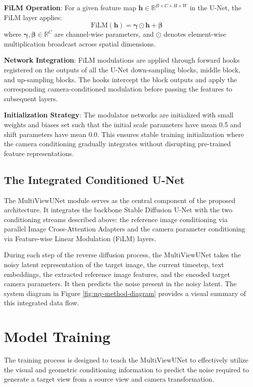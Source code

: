 \textbf{FiLM Operation}: For a given feature map $\mathbf{h} \in \mathbb{R}^{B \times C \times H \times W}$ in the U-Net, the FiLM layer applies:
\[ \text{FiLM}(\mathbf{h}) = \boldsymbol{\gamma} \odot \mathbf{h} + \boldsymbol{\beta} \]
where $\boldsymbol{\gamma}, \boldsymbol{\beta} \in \mathbb{R}^C$ are channel-wise parameters, and $\odot$ denotes element-wise multiplication broadcast across spatial dimensions.

\textbf{Network Integration}: FiLM modulations are applied through forward hooks registered on the outputs of all the U-Net down-sampling blocks, middle block, and up-sampling blocks. The hooks intercept the block outputs and apply the corresponding camera-conditioned modulation before passing the features to subsequent layers.

\textbf{Initialization Strategy}: The modulator networks are initialized with small weights and biases set such that the initial scale parameters have mean 0.5 and shift parameters have mean 0.0. This ensures stable training initialization where the camera conditioning gradually integrates without disrupting pre-trained feature representations.

\subsection{The Integrated Conditioned U-Net}
The $\text{MultiViewUNet}$ module serves as the central component of the proposed architecture. It integrates the backbone Stable Diffusion U-Net with the two conditioning streams described above: the reference image conditioning via parallel Image Cross-Attention Adapters and the camera parameter conditioning via Feature-wise Linear Modulation (FiLM) layers.

During each step of the reverse diffusion process, the $\text{MultiViewUNet}$ takes the noisy latent representation of the target image, the current timestep, text embeddings, the extracted reference image features, and the encoded target camera parameters. It then predicts the noise present in the noisy latent. The system diagram in Figure \ref{fig:my-method-diagram} provides a visual summary of this integrated data flow.

\section{Model Training}
The training process is designed to teach the $\text{MultiViewUNet}$ to effectively utilize the visual and geometric conditioning information to predict the noise required to generate a target view from a source view and camera transformation.

